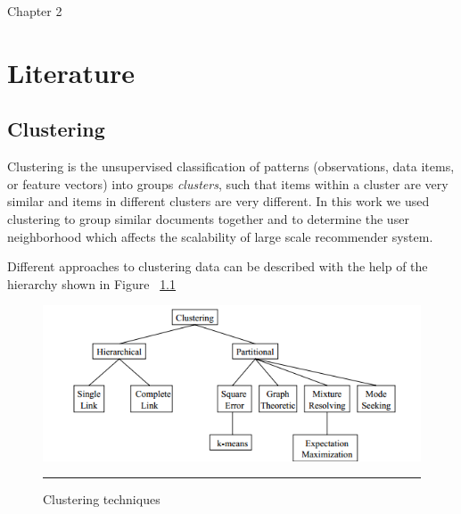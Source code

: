  Chapter 2

\chapter{Literature} %

\label{Chapter2} %


\section{Clustering}
Clustering is the unsupervised classification of patterns (observations, data items, or feature vectors) into groups \textit{clusters}, such that items within a cluster are very similar and items in different clusters are very different.
In this work we used clustering to group similar documents together and to determine the user neighborhood which affects the scalability of large scale recommender system.

Different approaches to clustering data can be described with the help of the hierarchy shown in Figure ~\ref{fig:clustering_approaches}

\begin{figure}[htbp]
	\centering
		\includegraphics{./Figures/clustering.png}
		\rule{35em}{0.5pt}
	\caption[Clustering techniques]{Clustering techniques}
	\label{fig:clustering_approaches}
\end{figure}

